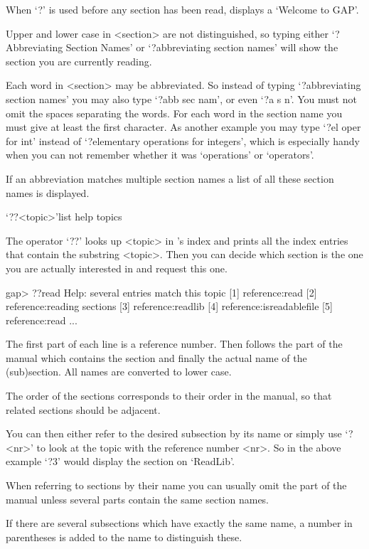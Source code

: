 When `?' is used before any section has been read, {\GAP} displays a
`Welcome to GAP'.


Upper and lower case in <section> are not distinguished, so typing either
`?Abbreviating Section Names' or `?abbreviating section names' will show
the section you are currently reading.

Each word in <section> may be abbreviated. So instead of typing
`?abbreviating section names' you may also type `?abb sec nam', or even `?a
s n'. You must not omit the spaces separating the words. For each word in
the section name you must give at least the first character. As another
example you may type `?el oper for int' instead of `?elementary operations
for integers', which is especially handy when you can not remember whether
it was `operations' or `operators'.

If an abbreviation matches multiple section names a list of all these
section names is displayed.


\>`??<topic>'{list help topics}

The operator `??' looks up <topic> in {\GAP}'s index and prints all the
index entries that contain the substring <topic>.
Then you can decide which section is the one you are actually interested
in and request this one.

\begintt
gap> ??read
Help: several entries match this topic
[1] reference:read
[2] reference:reading sections
[3] reference:readlib
[4] reference:isreadablefile
[5] reference:read
...
\endtt

The first part of each line is a reference number.  Then follows the
part of the manual which contains the section and finally the actual
name of the (sub)section. All names are converted to lower case.

The order of the sections corresponds to their order in the
{\GAP} manual, so that related sections should be adjacent.

You can then either refer to the desired subsection by its name or simply
use `?<nr>' to look at the topic with the reference number <nr>. So in the
above example `?3' would display the section on `ReadLib'.

When referring to sections by their name you can usually omit the part
of the manual unless several parts contain the same section names.

If there are several subsections which have exactly the same name, a number
in parentheses is added to the name to distinguish these.


